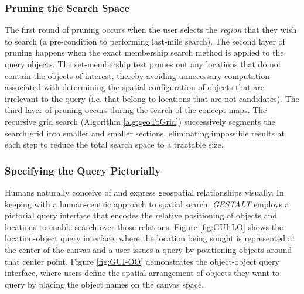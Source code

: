 \subsubsection{Pruning the Search Space}
The first round of pruning occurs when the user selects the \emph{region} that they wish to search (a pre-condition to performing last-mile search). 
The second layer of pruning happens when the exact membership search method is applied to the query objects.
The set-membership test prunes out any locations that do not contain the objects of interest, thereby avoiding unnecessary computation associated with determining the spatial configuration of objects that are irrelevant to the query (i.e. that belong to locations that are not candidates).
The third layer of pruning occurs during the search of the concept maps. 
The recursive grid search (Algorithm \ref{alg:geoToGrid}) successively segments the search grid into smaller and smaller sections, eliminating impossible results at each step to reduce the total search space to a tractable size.

\subsubsection{Specifying the Query Pictorially}
Humans naturally conceive of and express geospatial relationships visually.
In keeping with a human-centric approach to spatial search, \emph{GESTALT} employs a pictorial query interface that encodes the relative positioning of objects and locations to enable search over those relations.
Figure \ref{fig:GUI-LO} shows the location-object query interface, where the location being sought is represented at the center of the canvas and a user issues a query by positioning objects around that center point. 
Figure \ref{fig:GUI-OO} demonstrates the object-object query interface, where users define the spatial arrangement of objects they want to query by placing the object names on the canvas space. 


